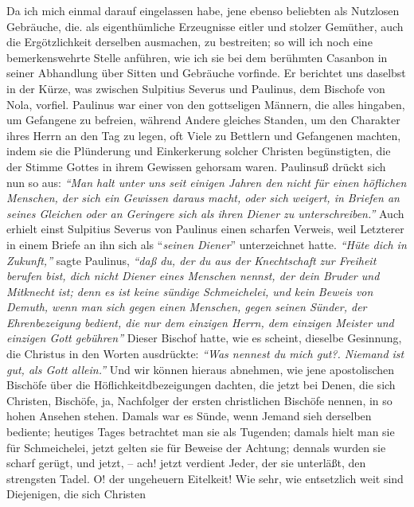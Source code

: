 Da ich mich einmal darauf eingelassen habe, jene ebenso beliebten als Nutzlosen
Gebräuche, die. als eigenthümliche Erzeugnisse eitler und stolzer Gemüther, auch
die Ergötzlichkeit derselben ausmachen, zu bestreiten; so will ich noch eine
bemerkenswehrte Stelle anführen, wie ich sie bei dem berühmten Casanbon in
seiner Abhandlung über Sitten und Gebräuche vorfinde. Er berichtet uns daselbst
in der Kürze, was zwischen Sulpitius Severus und Paulinus, dem Bischofe von
Nola, vorfiel. Paulinus war einer von den gottseligen Männern, die alles
hingaben, um Gefangene zu befreien, während Andere gleiches Standen, um den
Charakter ihres Herrn an den Tag zu legen, oft Viele zu Bettlern und Gefangenen
machten, indem sie die Plünderung und Einkerkerung solcher Christen
begünstigten, die der Stimme Gottes in ihrem Gewissen gehorsam waren. Paulinsuß
drückt sich nun so aus: \textit{"`Man halt unter uns seit einigen Jahren den nicht für
einen höflichen Menschen, der sich ein Gewissen daraus macht, oder sich weigert,
in Briefen an seines Gleichen oder an Geringere sich als ihren Diener zu
unterschreiben."'} Auch erhielt einst Sulpitius Severus von Paulinus einen
scharfen Verweis, weil Letzterer in einem Briefe an ihn sich als "`\textit{seinen Diener}"'
unterzeichnet hatte. \textit{"`Hüte dich in Zukunft,"'} sagte Paulinus, \textit{"`daß du, der du
aus der Knechtschaft zur Freiheit berufen bist, dich nicht Diener eines Menschen
nennst, der dein Bruder und Mitknecht ist; denn es ist keine sündige
Schmeichelei, und kein Beweis von Demuth, wenn man sich gegen einen Menschen,
gegen seinen Sünder, der Ehrenbezeigung bedient, die nur dem einzigen Herrn, dem
einzigen Meister und einzigen Gott gebühren"'} Dieser Bischof hatte, wie es
scheint, dieselbe Gesinnung, die Christus in den Worten ausdrückte: \textit{"`Was
nennest du mich gut?. Niemand ist gut, als Gott allein."'} Und wir können hieraus
abnehmen, wie jene apostolischen Bischöfe über die Höflichkeitdbezeigungen
dachten, die jetzt bei Denen, die sich Christen, Bischöfe, ja, Nachfolger der
ersten christlichen Bischöfe nennen, in so hohen Ansehen stehen. Damals war es
Sünde, wenn Jemand sieh derselben bediente; heutiges Tages betrachtet man sie
als Tugenden; damals hielt man sie für Schmeichelei, jetzt gelten sie für
Beweise der Achtung; dennals wurden sie scharf gerügt, und jetzt, -- ach! jetzt
verdient Jeder, der sie unterläßt, den strengsten Tadel. O! der ungeheuern
Eitelkeit! Wie sehr, wie entsetzlich weit sind Diejenigen, die sich Christen
